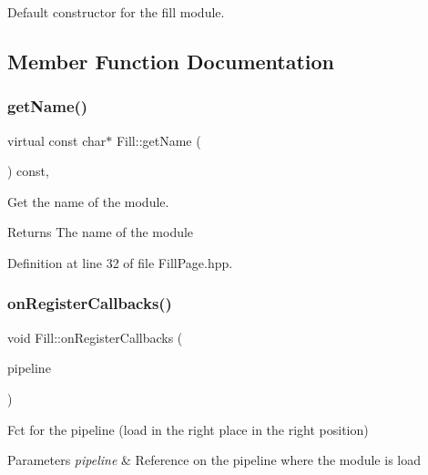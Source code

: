 Default constructor for the fill module. 



\subsection{Member Function Documentation}
\mbox{\label{class_fill_a5116eca7a853356f420f6474ade0983b}} 
\subsubsection{\texorpdfstring{get\+Name()}{getName()}}
{\footnotesize\ttfamily virtual const char$\ast$ Fill\+::get\+Name (\begin{DoxyParamCaption}\item[{void}]{ }\end{DoxyParamCaption}) const\hspace{0.3cm}{\ttfamily [inline]}, {\ttfamily [virtual]}}



Get the name of the module. 

\begin{DoxyReturn}{Returns}
The name of the module 
\end{DoxyReturn}


Definition at line 32 of file Fill\+Page.\+hpp.

\mbox{\label{class_fill_a440901ea6a6270194ca7e0e19c9bd88e}} 
\subsubsection{\texorpdfstring{on\+Register\+Callbacks()}{onRegisterCallbacks()}}
{\footnotesize\ttfamily void Fill\+::on\+Register\+Callbacks (\begin{DoxyParamCaption}\item[{o\+Z\+::\+Pipeline \&}]{pipeline }\end{DoxyParamCaption})\hspace{0.3cm}{\ttfamily [virtual]}}



Fct for the pipeline (load in the right place in the right position) 


\begin{DoxyParams}{Parameters}
{\em pipeline} & Reference on the pipeline where the module is load \\
\hline
\end{DoxyParams}


